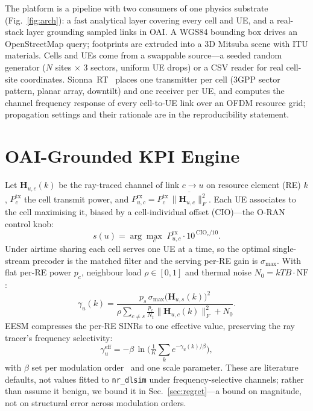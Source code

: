 \documentclass[conference]{IEEEtran}
\begin{document}
The platform is a pipeline with two consumers of one physics substrate (Fig.~\ref{fig:arch}): a fast analytical layer covering every cell and UE, and a real-stack layer grounding sampled links in OAI. A WGS84 bounding box drives an OpenStreetMap query; footprints are extruded into a 3D Mitsuba scene with ITU materials. Cells and UEs come from a swappable source---a seeded random generator ($N$ sites $\times$ 3 sectors, uniform UE drops) or a CSV reader for real cell-site coordinates. Sionna~RT~\cite{sionnart} places one transmitter per cell (3GPP sector pattern, planar array, downtilt) and one receiver per UE, and computes the channel frequency response of every cell-to-UE link over an OFDM resource grid; propagation settings and their rationale are in the reproducibility statement.

\section{OAI-Grounded KPI Engine}
\label{sec:kpi}
Let $\mathbf{H}_{u,c}(k)$ be the ray-traced channel of link $c\!\to\!u$ on resource element (RE) $k$, $P^{\mathrm{tx}}_c$ the cell transmit power, and $P^{\mathrm{rx}}_{u,c}=P^{\mathrm{tx}}_c\,\overline{\lVert\mathbf{H}_{u,c}\rVert_F^2}$. Each UE associates to the cell maximising it, biased by a cell-individual offset (CIO)---the O-RAN control knob:
\begin{equation}
s(u)=\arg\max_{c}\; P^{\mathrm{rx}}_{u,c}\cdot 10^{\,\mathrm{CIO}_c/10}.
\label{eq:assoc}
\end{equation}
Under airtime sharing each cell serves one UE at a time, so the optimal single-stream precoder is the matched filter and the serving per-RE gain is $\sigma_{\max}$. With flat per-RE power $p_c$, neighbour load $\rho\in[0,1]$ and thermal noise $N_0=kTB\cdot\mathrm{NF}$:
\begin{equation}
\gamma_u(k)=\frac{p_{s}\,\sigma_{\max}\!\big(\mathbf{H}_{u,s}(k)\big)^2}
{\rho\sum_{c\neq s}\frac{p_c}{N_t}\lVert\mathbf{H}_{u,c}(k)\rVert_F^2+N_0}.
\label{eq:sinr}
\end{equation}
EESM compresses the per-RE SINRs to one effective value, preserving the ray tracer's frequency selectivity:
\begin{equation}
\gamma^{\mathrm{eff}}_u=-\beta\,\ln\!\Big(\tfrac{1}{K}\textstyle\sum_{k}
e^{-\gamma_u(k)/\beta}\Big),
\label{eq:eesm}
\end{equation}
with $\beta$ set per modulation order~\cite{eesm_orig} and one scale parameter. These are literature defaults, not values fitted to \texttt{nr\_dlsim} under frequency-selective channels; rather than assume it benign, we bound it in Sec.~\ref{sec:regret}---a bound on magnitude, not on structural error across modulation orders.
\end{document}
